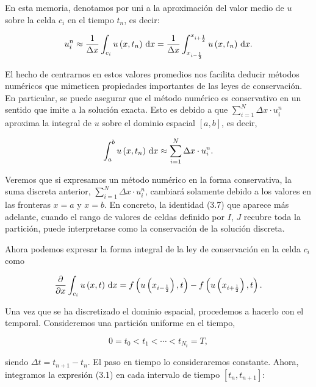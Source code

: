 En esta memoria, denotamos por uni a la aproximación del valor medio
de $u$ sobre la celda $c_{i}$ en el tiempo $t_{n}$, es decir:

\begin{equation*}
    u^{n}_{i}\approx
    \frac{1}{\Delta x}
    \int_{c_{i}}
    u\left(x,t_{n}\right)\dl x=
    \frac{1}{\Delta x}
    \int_{x_{i-\frac{1}{2}}}^{x_{i+\frac{1}{2}}}
    u\left(x,t_{n}\right)\dl x.
\end{equation*}

El hecho de centrarnos en estos valores promedios nos facilita
deducir métodos numéricos que mimeticen propiedades importantes de
las leyes de conservación.
En particular, se puede asegurar que el método numérico es
conservativo en un sentido que imite a la solución exacta.
Esto es debido a que $\sum_{i=1}^{N}\Delta x\cdot u^{n}_{i}$
aproxima la integral de $u$ sobre el dominio espacial
$\left[a,b\right]$, es decir,

\begin{equation*}
    \int_{a}^{b}
    u\left(x,t_{n}\right)\dl x\approx
    \sum_{i=1}^{N}
    \Delta x\cdot u^{n}_{i}.
\end{equation*}

Veremos que si expresamos un método numérico en la forma
conservativa, la suma discreta anterior,
$\sum_{i=1}^{N}\Delta x\cdot u^{n}_{i}$, cambiará solamente debido a
los valores en las fronteras $x=a$ y $x=b$.
En concreto, la identidad (3.7) que aparece más adelante, cuando el
rango de valores de celdas definido por $I$, $J$ recubre toda la
partición, puede interpretarse como la conservación de la solución
discreta.

Ahora podemos expresar la forma integral de la ley de conservación en
la celda $c_{i}$ como

\begin{equation*}
    \diffp{}{x}
    \int_{c_{i}}
    u\left(x,t\right)\dl x=
    f\left(u\left(x_{i-\frac{1}{2}}\right),t\right)-
    f\left(u\left(x_{i+\frac{1}{2}}\right),t\right).
\end{equation*}

Una vez que se ha discretizado el dominio espacial, procedemos a
hacerlo con el temporal.
Consideremos una partición uniforme en el tiempo,

\begin{equation*}
    0=t_{0}<
    t_{1}<
    \cdots<
    t_{N_{t}}=
    T,
\end{equation*}

siendo $\Delta t=t_{n+1}-t_{n}$.
El paso en tiempo lo consideraremos constante.
Ahora, integramos la expresión (3.1) en cada intervalo de tiempo
$\left[t_{n},t_{n+1}\right]$:

